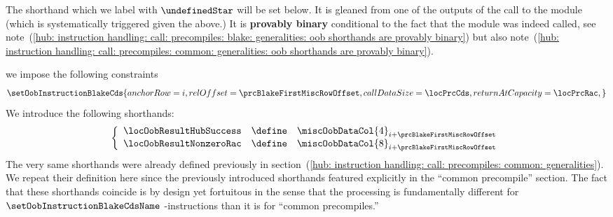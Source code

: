 \begin{description}
\begin{description}
				\saNote{}
				The shorthand \locOobResultHubSuccess{} which we label with $\undefinedStar$ will be set below.
				It is gleaned from one of the outputs of the call to the \oobMod{} module (which is systematically triggered given the above.)
				It is \textbf{provably binary} conditional to the fact that the \oobMod{} module was indeed called,
				see note~(\ref{hub: instruction handling: call: precompiles: blake: generalities: oob shorthands are provably binary})
				but also note~(\ref{hub: instruction handling: call: precompiles: common: generalities: oob shorthands are provably binary}).
			\item[\underline{Setting the \oobMod{} instruction and shorthands:}] 
				we impose the following constraints
				\[
					\label{hub: instruction handling: call: precompiles: blake: hub success call}
					\setOobInstructionBlakeCds {
						anchorRow        = i                           ,
						relOffset        = \prcBlakeFirstMiscRowOffset ,
						callDataSize     = \locPrcCds                  ,
						returnAtCapacity = \locPrcRac                  ,
					}
				\]
				We introduce the following shorthands:
				\[
					\left\{ \begin{array}{lcl} \label{hub: instruction handling: call: precompiles: blake: shorthands}
						\locOobResultHubSuccess      & \define & \miscOobDataCol{4}_{i + \prcBlakeFirstMiscRowOffset} \\
						\locOobResultNonzeroRac      & \define & \miscOobDataCol{8}_{i + \prcBlakeFirstMiscRowOffset} \\
					\end{array} \right.
				\]
				\saNote{}
				The very same shorthands were already defined previously in section~(\ref{hub: instruction handling: call: precompiles: common: generalities}).
				We repeat their definition here since the previously introduced shorthands featured explicitly in the ``common precompile'' section.
				The fact that these shorthands coincide is by design yet fortuitous in the sense that the \oobMod{} processing is fundamentally different for
				$\setOobInstructionBlakeCdsName$ \oobMod{}-instructions than it is for ``common precompiles.''


\end{description}
\end{description}
